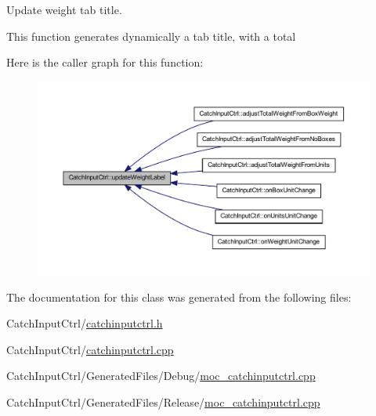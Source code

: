 Update weight tab title. 

This function generates dynamically a tab title, with a total 

Here is the caller graph for this function:\nopagebreak
\begin{figure}[H]
\begin{center}
\leavevmode
\includegraphics[width=400pt]{class_catch_input_ctrl_ab8e1629f9e58b12262a146f58d9309fe_icgraph}
\end{center}
\end{figure}




The documentation for this class was generated from the following files:\begin{DoxyCompactItemize}
\item 
CatchInputCtrl/\hyperlink{catchinputctrl_8h}{catchinputctrl.h}\item 
CatchInputCtrl/\hyperlink{catchinputctrl_8cpp}{catchinputctrl.cpp}\item 
CatchInputCtrl/GeneratedFiles/Debug/\hyperlink{_debug_2moc__catchinputctrl_8cpp}{moc\_\-catchinputctrl.cpp}\item 
CatchInputCtrl/GeneratedFiles/Release/\hyperlink{_release_2moc__catchinputctrl_8cpp}{moc\_\-catchinputctrl.cpp}\end{DoxyCompactItemize}
